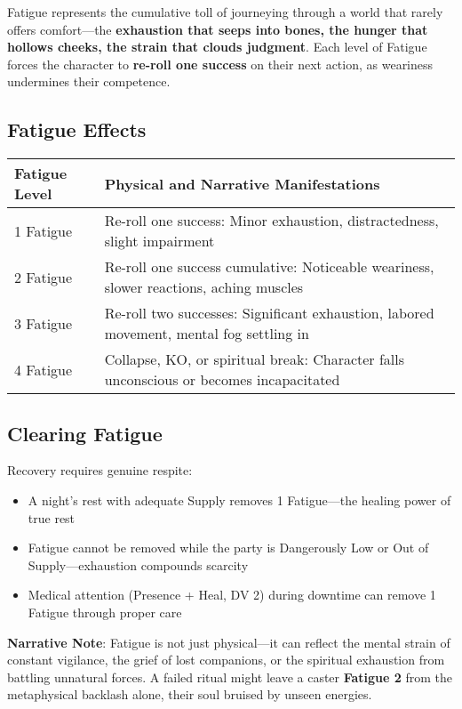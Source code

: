 Fatigue represents the cumulative toll of journeying through a world that rarely offers comfort---the \textbf{exhaustion that seeps into bones, the hunger that hollows cheeks, the strain that clouds judgment}. Each level of Fatigue forces the character to \textbf{re-roll one success} on their next action, as weariness undermines their competence.

\subsection*{Fatigue Effects}

\begin{fatebox}
\begin{tabularx}{\textwidth}{lX}
\toprule
\textbf{Fatigue Level} & \textbf{Physical and Narrative Manifestations} \\
\midrule
1 Fatigue & Re-roll one success: Minor exhaustion, distractedness, slight impairment \\
2 Fatigue & Re-roll one success cumulative: Noticeable weariness, slower reactions, aching muscles \\
3 Fatigue & Re-roll two successes: Significant exhaustion, labored movement, mental fog settling in \\
4 Fatigue & Collapse, KO, or spiritual break: Character falls unconscious or becomes incapacitated \\
\bottomrule
\end{tabularx}
\end{fatebox}

\subsection*{Clearing Fatigue}

Recovery requires genuine respite:

\begin{itemize}
    \item A night's rest with adequate Supply removes 1 Fatigue—the healing power of true rest
    \item Fatigue cannot be removed while the party is Dangerously Low or Out of Supply—exhaustion compounds scarcity
    \item Medical attention (Presence + Heal, DV 2) during downtime can remove 1 Fatigue through proper care
\end{itemize}

\textbf{Narrative Note}: Fatigue is not just physical---it can reflect the mental strain of constant vigilance, the grief of lost companions, or the spiritual exhaustion from battling unnatural forces. A failed ritual might leave a caster \textbf{Fatigue 2} from the metaphysical backlash alone, their soul bruised by unseen energies.

